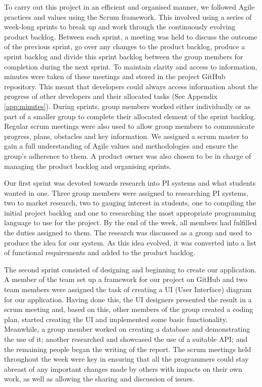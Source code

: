 \documentclass[11pt]{article}
\begin{document}
To carry out this project in an efficient and organised manner, we followed
Agile practices and values using the Scrum framework. This involved using a
series of week-long sprints to break up and work through the continuously
evolving product backlog. Between each sprint, a meeting was held to discuss
the outcome of the previous sprint, go over any changes to the product backlog,
produce a sprint backlog and divide this sprint backlog between the group
members for completion during the next sprint. To maintain clarity and access
to information, minutes were taken of these meetings and stored in the project
GitHub repository. This meant that developers could always access information
about the progress of other developers and their allocated tasks (See Appendix
\ref{app:minutes}). During sprints, group members worked either individually or
as part of a smaller group to complete their allocated element of the sprint
backlog. Regular scrum meetings were also used to allow group members to
communicate progress, plans, obstacles and key information. We assigned a scrum
master to gain a full understanding of Agile values and methodologies and
ensure the group's adherence to them. A product owner was also chosen to be in
charge of managing the product backlog and organising sprints.\par

Our first sprint was devoted towards research into PI systems and what students
wanted in one. Three group members were assigned to researching PI systems, two
to market research, two to gauging interest in students, one to compiling the
initial project backlog and one to researching the most appropriate programming
language to use for the project. By the end of the week, all members had
fulfilled the duties assigned to them. The research was discussed as a group
and used to produce the idea for our system. As this idea evolved, it was
converted into a list of functional requirements and added to the product
backlog.\par

The second sprint consisted of designing and beginning to create our
application. A member of the team set up a framework for our project on GitHub
and two team members were assigned the task of creating a UI (User Interface)
diagram for our application. Having done this, the UI designers presented the
result in a scrum meeting and, based on this, other members of the group
created a coding plan, started creating the UI and implemented some basic
functionality. Meanwhile, a group member worked on creating a database and
demonstrating the use of it; another researched and showcased the use of a
suitable API; and the remaining people began the writing of the report. The
scrum meetings held throughout the week were key in ensuring that all the
programmers could stay abreast of any important changes made by others with
impacts on their own work, as well as allowing the sharing and discussion of
issues.\par
\end{document}
